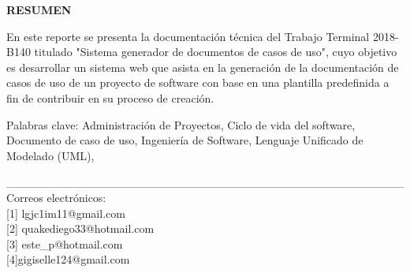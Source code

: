 \documentclass[12pt]{report}
\begin{document}
\begin{center}
	\begin{large}	
	\textbf {RESUMEN}\\
	\vspace*{0.1in}
	\end{large}
	\begin{normalsize}
		En este reporte se presenta la documentación técnica del Trabajo Terminal 2018-B140 titulado
		"Sistema generador de documentos de casos de uso", cuyo objetivo es desarrollar un sistema web que asista en la generación de la documentación de casos de uso de un proyecto de software con base en una plantilla predefinida a fin de contribuir en su proceso de creación.\\
		\vspace*{0.1in}
	\end{normalsize}
		\begin{small}
		Palabras clave: Administración de Proyectos, Ciclo de vida del software, Documento de caso de uso, Ingeniería de Software, Lenguaje Unificado de Modelado (UML), 
		\end{small}
\end{center}

\begin{scriptsize}
    \_\_\_\_\_\_\_\_\_\_\_\_\_\_\_\_\_\_\_\_\_\_\_\_\_\_\_\_\_\_\_\_\_\_\_\_\_\_\_\_\_\_\_\_\_\_\_\_ \\
    Correos electrónicos:\\
	\hypertarget{x01}{[1]} lgjc1im11@gmail.com \\
	\hypertarget{x01}{[2]} quakediego33@hotmail.com \\  
	\hypertarget{x01}{[3]} este\_p@hotmail.com \\
 	\hypertarget{x01}{[4]}gigiselle124@gmail.com
	
\end{scriptsize}

\tableofcontents






%


%
\end{document}
